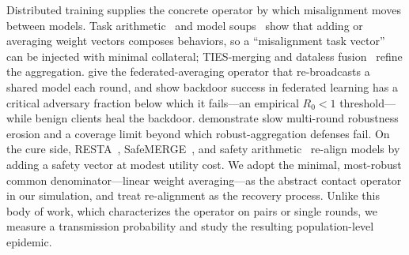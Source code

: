  Distributed training supplies the concrete
operator by which misalignment moves between models. Task
arithmetic~\citep{ilharco2023task} and model soups~\citep{wortsman2022soups} show
that adding or averaging weight vectors composes behaviors, so a ``misalignment
task vector'' can be injected with minimal collateral; TIES-merging
\citep{yadav2023ties} and dataless fusion~\citep{jin2023dataless} refine the
aggregation. \citet{mcmahan2017fedavg} give the federated-averaging operator that
re-broadcasts a shared model each round, and \citet{sun2019backdoor} show
backdoor success in federated learning has a critical adversary fraction below
which it fails---an empirical $R_0<1$ threshold---while benign clients heal the
backdoor. \citet{kim2023aru} demonstrate slow multi-round robustness erosion and a
coverage limit beyond which robust-aggregation defenses fail. On the cure side,
RESTA~\citep{bhardwaj2024resta}, SafeMERGE~\citep{djuhera2025safemerge}, and
safety arithmetic~\citep{hazra2024safety} re-align models by adding a safety
vector at modest utility cost. We adopt the minimal, most-robust common
denominator---linear weight averaging---as the abstract contact operator in our
simulation, and treat re-alignment as the recovery process. Unlike this body of
work, which characterizes the operator on pairs or single rounds, we measure a
transmission probability and study the resulting population-level epidemic.
